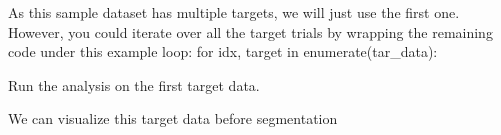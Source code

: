 \documentclass[letterpaper,10pt,english]{sphinxmanual}
\begin{document}
\sphinxAtStartPar
As this sample dataset has multiple targets, we will just use the first one. 
However, you could iterate over all the target trials by wrapping the remaining code
under this example loop:
for idx, target in enumerate(tar\_data):

\sphinxAtStartPar
Run the analysis on the first target data.

\begin{sphinxVerbatim}[commandchars=\\\{\}]
  \PYG{p}{[}\PYG{p}{]}
\end{sphinxVerbatim}

\sphinxAtStartPar
We can visualize this target data before segmentation

\begin{sphinxVerbatim}[commandchars=\\\{\}]
   \PYG{p}{[}      \PYG{p}{]} 
\end{sphinxVerbatim}

\begin{figure}[htbp]
\centering

\noindent{}
\end{figure}

\begin{sphinxVerbatim}[commandchars=\\\{\}]
\end{sphinxVerbatim}
\end{document}
